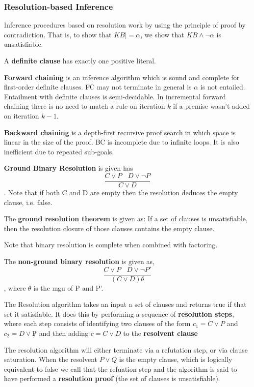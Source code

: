 \documentclass{article}
\begin{document}
\subsubsection{Resolution-based Inference}

Inference procedures based on resolution work by using the principle of proof by contradiction. That is, to show that $KB |= \alpha$, we show that $KB \wedge \neg \alpha$ is unsatisfiable. 

A \textbf{definite clause} has exactly one positive literal. 

\textbf{Forward chaining} is an inference algorithm which is sound and complete for first-order definite clauses. FC may not terminate in general is $\alpha$ is not entailed. Entailment with definite clauses is semi-decidable. In incremental forward chaining there is no need to match a rule on iteration $k$ if a premise wasn't added on iteration $k-1$. \newline

\textbf{Backward chaining} is a depth-first recursive proof search in which space is linear in the size of the proof. BC is incomplete due to infinite loops. It is also inefficient due to repeated sub-goals.

\textbf{Ground Binary Resolution} is given has $$\frac{C \vee P \: \: \: \: D \vee \neg P}{C \vee D}$$. Note that if both C and D are empty then the resolution deduces the empty clause, i.e. false.  \newline

The \textbf{ground resolution theorem} is given as: If a set of clauses is unsatisfiable, then the resolution closure of those clauses contains the empty clause. 

Note that binary resolution is complete when combined with factoring. 

The \textbf{non-ground binary resolution} is given as, $$\frac{C \vee P \: \: \: \: D \vee \neg P'}{(C \vee D) \theta}$$, where $\theta$ is the mgu of P and P'. 

The Resolution algorithm takes an input a set of clauses and returns true if that set it satisfiable. It does this by performing a sequence of \textbf{resolution steps}, where each step consists of identifying two clauses of the form $c_1 = C \vee P$ and $c_2 = D \vee \not P$ and then adding $c = C \vee D$ to the \textbf{resolvent clause} \newline

The resolution algorithm will either terminate via a refutation step, or via clause saturation. When the resolvent $P \vee Q$ is the empty clause, which is logically equivalent to false we call that the refuation step and the algorithm is said to have performed a \textbf{resolution proof} (the set of clauses is unsatisfiable). 
\end{document}
